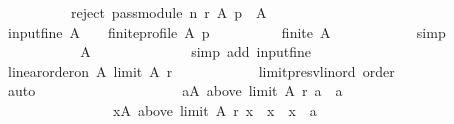 \begin{isabellebody}
\ \ \ \ \ \ \ \ \ \ reject\ {\isacharparenleft}{\kern0pt}pass{\isacharunderscore}{\kern0pt}module\ n\ r{\isacharparenright}{\kern0pt}\ A\ p\ {\isasymnoteq}\ A{\isachardoublequoteclose}\isanewline
\ \ \ \ \ \ \isamarkupfalse%
\isanewline
\ \ \ \ \ \ \ \ \isamarkupfalse%
\ input{\isacharunderscore}{\kern0pt}fine{\isacharcolon}{\kern0pt}\ {\isachardoublequoteopen}A\ {\isasymnoteq}\ {\isacharbraceleft}{\kern0pt}{\isacharbraceright}{\kern0pt}\ {\isasymand}\ finite{\isacharunderscore}{\kern0pt}profile\ A\ p{\isachardoublequoteclose}\isanewline
\ \ \ \ \ \ \ \ \isamarkupfalse%
\ {\isachardoublequoteopen}finite\ A{\isachardoublequoteclose}\isanewline
\ \ \ \ \ \ \ \ \ \ \isamarkupfalse%
\ simp\isanewline
\ \ \ \ \ \ \ \ \isamarkupfalse%
\ \isamarkupfalse%
\ {\isachardoublequoteopen}A\ {\isasymnoteq}\ {\isacharbraceleft}{\kern0pt}{\isacharbraceright}{\kern0pt}{\isachardoublequoteclose}\isanewline
\ \ \ \ \ \ \ \ \ \ \isamarkupfalse%
\ {\isacharparenleft}{\kern0pt}simp\ add{\isacharcolon}{\kern0pt}\ input{\isacharunderscore}{\kern0pt}fine{\isacharparenright}{\kern0pt}\isanewline
\ \ \ \ \ \ \ \ \isamarkupfalse%
\ \isamarkupfalse%
\ {\isachardoublequoteopen}linear{\isacharunderscore}{\kern0pt}order{\isacharunderscore}{\kern0pt}on\ A\ {\isacharparenleft}{\kern0pt}limit\ A\ r{\isacharparenright}{\kern0pt}{\isachardoublequoteclose}\isanewline
\ \ \ \ \ \ \ \ \ \ \isamarkupfalse%
\ limit{\isacharunderscore}{\kern0pt}presv{\isacharunderscore}{\kern0pt}lin{\isacharunderscore}{\kern0pt}ord\ order\isanewline
\ \ \ \ \ \ \ \ \ \ \isamarkupfalse%
\ auto\isanewline
\ \ \ \ \ \ \ \ \isamarkupfalse%
\ \isamarkupfalse%
\isanewline
\ \ \ \ \ \ \ \ \ \ {\isachardoublequoteopen}{\isasymexists}a{\isasymin}A{\isachardot}{\kern0pt}\ above\ {\isacharparenleft}{\kern0pt}limit\ A\ r{\isacharparenright}{\kern0pt}\ a\ {\isacharequal}{\kern0pt}\ {\isacharbraceleft}{\kern0pt}a{\isacharbraceright}{\kern0pt}\ {\isasymand}\isanewline
\ \ \ \ \ \ \ \ \ \ \ \ \ \ \ \ {\isacharparenleft}{\kern0pt}{\isasymforall}x{\isasymin}A{\isachardot}{\kern0pt}\ above\ {\isacharparenleft}{\kern0pt}limit\ A\ r{\isacharparenright}{\kern0pt}\ x\ {\isacharequal}{\kern0pt}\ {\isacharbraceleft}{\kern0pt}x{\isacharbraceright}{\kern0pt}\ {\isasymlongrightarrow}\ x\ {\isacharequal}{\kern0pt}\ a{\isacharparenright}{\kern0pt}{\isachardoublequoteclose}\isanewline
\ \ \ \ \ \ \ \ \ \ \isamarkupfalse%

\end{isabellebody}
